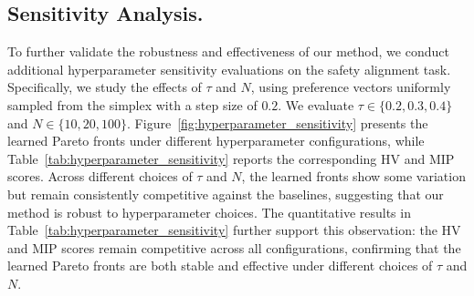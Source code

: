 \documentclass{article}
\begin{document}
\subsection{Sensitivity Analysis.}
To further validate the robustness and effectiveness of our method, we conduct additional hyperparameter sensitivity evaluations on the safety alignment task. Specifically, we study the effects of $\tau$ and $N$, using preference vectors uniformly sampled from the simplex with a step size of $0.2$. We evaluate $\tau \in \{0.2, 0.3, 0.4\}$ and $N \in \{10, 20, 100\}$. Figure~\ref{fig:hyperparameter_sensitivity} presents the learned Pareto fronts under different hyperparameter configurations, while Table~\ref{tab:hyperparameter_sensitivity} reports the corresponding HV and MIP scores.
Across different choices of $\tau$ and $N$, the learned fronts show some variation but remain consistently competitive against the baselines, suggesting that our method is robust to hyperparameter choices. The quantitative results in Table~\ref{tab:hyperparameter_sensitivity} further support this observation: the HV and MIP scores remain competitive across all configurations, confirming that the learned Pareto fronts are both stable and effective under different choices of $\tau$ and $N$.
\end{document}
